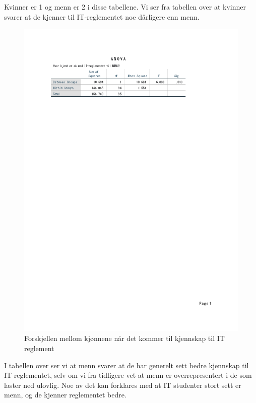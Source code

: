 Kvinner er 1 og menn er 2 i disse tabellene. Vi ser fra tabellen over at kvinner svarer at de kjenner til IT-reglementet noe dårligere enn menn. 
\begin{figure}[H]
    \centering
    \includegraphics[scale=0.8]{case_1/bilder/kjonn_kjent_anova.pdf}
    \caption{Forskjellen mellom kjønnene når det kommer til kjennskap til IT reglement}
    \label{fig:fakultet_pastander_anova}
\end{figure}

I tabellen over ser vi at menn svarer at de har generelt sett bedre kjennskap til IT reglementet, selv om vi fra tidligere vet at menn er overrepresentert i de som laster ned ulovlig. Noe av det kan forklares med at IT studenter stort sett er menn, og de kjenner reglementet bedre. 

